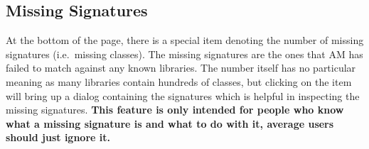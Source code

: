 
\subsection{Missing Signatures}\label{subsec:missing-signatures}
At the bottom of the page, there is a special item denoting the number of missing signatures (i.e.\ missing classes).
The missing signatures are the ones that AM has failed to match against any known libraries. The number itself has no
particular meaning as many libraries contain hundreds of classes, but clicking on the item will bring up a dialog
containing the signatures which is helpful in inspecting the missing signatures. \textbf{This feature is only intended
for people who know what a missing signature is and what to do with it, average users should just ignore it.}

